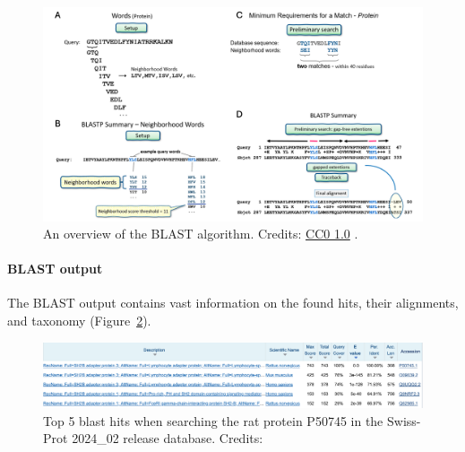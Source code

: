 \begin{figure}[!htbp]
\centering
\includegraphics[width=1\linewidth]{files/blast-d0e05e10ecd313dcc8deac97dde44ba2.png}
\caption[]{An overview of the BLAST algorithm.
Credits: \href{https://creativecommons.org/publicdomain/zero/1.0/}{CC0 1.0} \cite{blast_2022}.}
\label{blast_figure}
\end{figure}

\paragraph{BLAST output}

The BLAST output contains vast information on the found hits, their alignments, and taxonomy (Figure~\ref{blast_output}).

\begin{figure}[!htbp]
\centering
\includegraphics[width=1\linewidth]{files/blast_output-fb4ececca6ae3390731902ad57c4b880.png}
\caption[]{Top 5 blast hits when searching the rat protein P50745 in the Swiss-Prot 2024\_02 release database.
Credits: \cite{blast_2009}}
\label{blast_output}
\end{figure}

